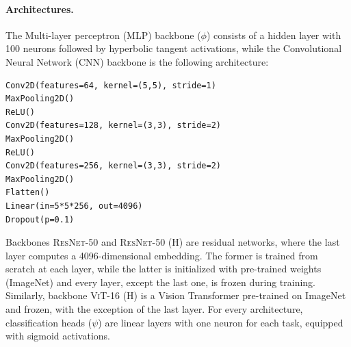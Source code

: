 \paragraph{Architectures.} The Multi-layer perceptron (\textsc{MLP}) backbone ($\phi$) consists of a hidden layer with 100 neurons followed by hyperbolic tangent activations, while the Convolutional Neural Network (\textsc{CNN}) backbone is the following architecture:
\begin{verbatim}
Conv2D(features=64, kernel=(5,5), stride=1)
MaxPooling2D()
ReLU()
Conv2D(features=128, kernel=(3,3), stride=2)
MaxPooling2D()
ReLU()
Conv2D(features=256, kernel=(3,3), stride=2)
MaxPooling2D()
Flatten()
Linear(in=5*5*256, out=4096)
Dropout(p=0.1)
\end{verbatim}
Backbones \textsc{ResNet-50} and \textsc{ResNet-50 (H)} are residual networks, where the last layer computes a 4096-dimensional embedding. The former is trained from scratch at each layer, while the latter is initialized with pre-trained weights (ImageNet) and every layer, except the last one, is frozen during training.
Similarly, backbone \textsc{ViT-16 (H)} is a Vision Transformer pre-trained on ImageNet and frozen, with the exception of the last layer.
For every architecture, classification heads ($\psi$) are linear layers with one neuron for each task, equipped with sigmoid activations.

